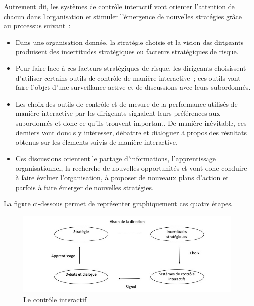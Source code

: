 \documentclass{kaobook}
\begin{document}
Autrement dit, les systèmes de contrôle interactif vont orienter l'attention de chacun dans l'organisation et stimuler l'émergence de nouvelles stratégies grâce au processus suivant :\\
\begin{itemize}
\item Dans une organisation donnée, la stratégie choisie et la vision des dirigeants produisent des incertitudes stratégiques ou facteurs stratégiques de risque.\\
\item Pour faire face à ces facteurs stratégiques de risque, les dirigeants choisissent d'utiliser certains outils de contrôle de manière interactive ; ces outils vont faire l'objet d'une surveillance active et de discussions avec leurs subordonnés.\\
\item Les choix des outils de contrôle et de mesure de la performance utilisés de manière interactive par les dirigeants signalent leurs préférences aux subordonnés et donc ce qu'ils trouvent important. De manière inévitable, ces derniers vont donc s'y intéresser, débattre et dialoguer à propos des résultats obtenus sur les éléments suivis de manière interactive.\\
\item Ces discussions orientent le partage d'informations, l'apprentissage organisationnel, la recherche de nouvelles opportunités et vont donc conduire à faire évoluer l'organisation, à proposer de nouveaux plans d'action et parfois à faire émerger de nouvelles stratégies.\\
\end{itemize}
La figure ci-dessous permet de représenter graphiquement ces quatre étapes.\\

\begin{figure}[htbp]
\centering
\includegraphics[width=.9\linewidth]{./img/inter.jpeg}
\caption{Le contrôle interactif}
\end{figure}
\end{document}
